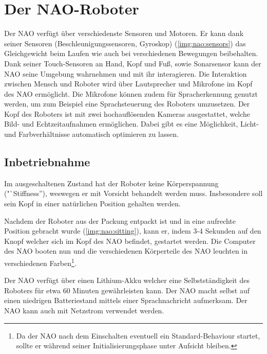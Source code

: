 \chapter{Der NAO-Roboter}

    Der NAO verfügt über verschiedenste Sensoren und Motoren.
    Er kann dank seiner Sensoren (Beschleunigungssensoren, Gyroskop)
    (\autoref{img:nao:sensors}) das Gleichgewicht
    beim Laufen wie auch bei verschiedenen Bewegungen beibehalten.
    Dank seiner Touch-Sensoren an Hand, Kopf und Fuß, sowie Sonarsensor kann der
    NAO seine Umgebung wahrnehmen und mit ihr interagieren.
    Die Interaktion zwischen Mensch und Roboter wird über Lautsprecher und
    Mikrofone im Kopf des NAO ermöglicht.
    Die Mikrofone können zudem für Spracherkennung genutzt werden, um zum
    Beispiel eine Sprachsteuerung des Roboters umzusetzen.
    Der Kopf des Roboters ist mit zwei hochauflösenden Kameras ausgestattet,
    welche Bild- und Echtzeitaufnahmen ermöglichen.
    Dabei gibt es eine Möglichkeit, Licht- und Farbverhältnisse automatisch
    optimieren zu lassen.

    \section{Inbetriebnahme}

        Im ausgeschaltenen Zustand hat der Roboter keine Körperspannung
        ("`Stiffness''), weswegen er mit Vorsicht behandelt werden muss.
        Insbesondere soll sein Kopf in einer natürlichen Position gehalten
        werden.

        Nachdem der Roboter aus der Packung entpackt ist und in eine aufrechte
        Position gebracht wurde (\autoref{img:nao:sitting}), kann er, indem 3-4
        Sekunden auf den Knopf welcher sich im Kopf des NAO befindet, gestartet
        werden.
        Die Computer des NAO booten nun und die verschiedenen Körperteile des
        NAO leuchten in verschiedenen Farben\footnote{
            Da der NAO nach dem Einschalten eventuell ein Standard-Behaviour
            startet, sollte er während seiner Initialisierungsphase unter
            Aufsicht bleiben.
        }.

        Der NAO verfügt über einen Lithium-Akku welcher eine Selbstständigkeit
        des Roboters für etwa 60 Minuten gewährleisten kann.
        Der NAO macht selbst auf einen niedrigen Batteriestand mittels einer
        Sprachnachricht aufmerksam. Der NAO kann auch mit Netzstrom verwendet
        werden.

